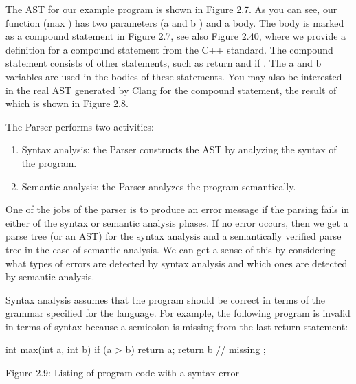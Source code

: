 
The AST for our example program is shown in Figure 2.7. As you can see, our function (max ) has two parameters (a and b ) and a body. The body is marked as a compound statement in Figure 2.7, see also Figure 2.40, where we provide a definition for a compound statement from the C++ standard. The compound statement consists of other statements, such as return and if . The a and b variables are used in the bodies of these statements. You may also be interested in the real AST generated by Clang for the compound statement, the result of which is shown in Figure 2.8.


The Parser performs two activities:

\begin{enumerate}
\item
Syntax analysis: the Parser constructs the AST by analyzing the syntax of the program.

\item
Semantic analysis: the Parser analyzes the program semantically.
\end{enumerate}

One of the jobs of the parser is to produce an error message if the parsing fails in either of the syntax or semantic analysis phases. If no error occurs, then we get a parse tree (or an AST) for the syntax analysis and a semantically verified parse tree in the case of semantic analysis. We can get a sense of this by considering what types of errors are detected by syntax analysis and which ones are detected by semantic analysis.

Syntax analysis assumes that the program should be correct in terms of the grammar specified for the language. For example, the following program is invalid in terms of syntax because a semicolon is missing from the last return statement:

\begin{cpp}
int max(int a, int b) {
  if (a > b)
    return a;
  return b // missing ;
}
\end{cpp}

\begin{center}
Figure 2.9: Listing of program code with a syntax error
\end{center}

